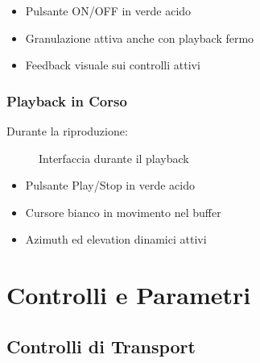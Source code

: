 \documentclass[a4paper,11pt,openany]{book}
\begin{document}
\begin{itemize}
    \item Pulsante ON/OFF in verde acido
    \item Granulazione attiva anche con playback fermo
    \item Feedback visuale sui controlli attivi
\end{itemize}

\subsection{Playback in Corso}

Durante la riproduzione:

\begin{figure}[H]
    \centering
    \caption{Interfaccia durante il playback}
    \label{fig:interface_playing}
\end{figure}

\begin{itemize}
    \item Pulsante Play/Stop in verde acido
    \item Cursore bianco in movimento nel buffer
    \item Azimuth ed elevation dinamici attivi
\end{itemize}

\chapter{Controlli e Parametri}

\section{Controlli di Transport}
\end{document}

